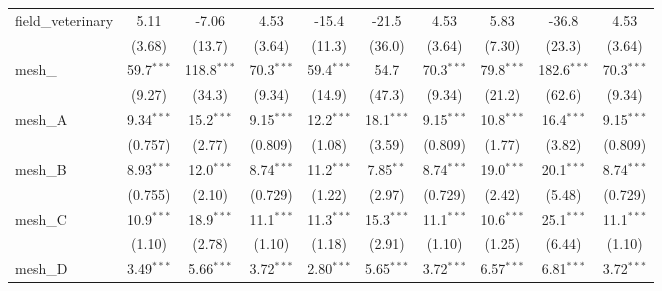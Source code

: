 \begin{tabular}{lccccccccc}
   field\_veterinary                                           & 5.11          & -7.06         & 4.53          & -15.4         & -21.5          & 4.53          & 5.83          & -36.8         & 4.53\\   
                                                               & (3.68)        & (13.7)        & (3.64)        & (11.3)        & (36.0)         & (3.64)        & (7.30)        & (23.3)        & (3.64)\\   
   mesh\_                                                      & 59.7$^{***}$  & 118.8$^{***}$ & 70.3$^{***}$  & 59.4$^{***}$  & 54.7           & 70.3$^{***}$  & 79.8$^{***}$  & 182.6$^{***}$ & 70.3$^{***}$\\   
                                                               & (9.27)        & (34.3)        & (9.34)        & (14.9)        & (47.3)         & (9.34)        & (21.2)        & (62.6)        & (9.34)\\   
   mesh\_A                                                     & 9.34$^{***}$  & 15.2$^{***}$  & 9.15$^{***}$  & 12.2$^{***}$  & 18.1$^{***}$   & 9.15$^{***}$  & 10.8$^{***}$  & 16.4$^{***}$  & 9.15$^{***}$\\   
                                                               & (0.757)       & (2.77)        & (0.809)       & (1.08)        & (3.59)         & (0.809)       & (1.77)        & (3.82)        & (0.809)\\   
   mesh\_B                                                     & 8.93$^{***}$  & 12.0$^{***}$  & 8.74$^{***}$  & 11.2$^{***}$  & 7.85$^{**}$    & 8.74$^{***}$  & 19.0$^{***}$  & 20.1$^{***}$  & 8.74$^{***}$\\   
                                                               & (0.755)       & (2.10)        & (0.729)       & (1.22)        & (2.97)         & (0.729)       & (2.42)        & (5.48)        & (0.729)\\   
   mesh\_C                                                     & 10.9$^{***}$  & 18.9$^{***}$  & 11.1$^{***}$  & 11.3$^{***}$  & 15.3$^{***}$   & 11.1$^{***}$  & 10.6$^{***}$  & 25.1$^{***}$  & 11.1$^{***}$\\   
                                                               & (1.10)        & (2.78)        & (1.10)        & (1.18)        & (2.91)         & (1.10)        & (1.25)        & (6.44)        & (1.10)\\   
   mesh\_D                                                     & 3.49$^{***}$  & 5.66$^{***}$  & 3.72$^{***}$  & 2.80$^{***}$  & 5.65$^{***}$   & 3.72$^{***}$  & 6.57$^{***}$  & 6.81$^{***}$  & 3.72$^{***}$\\   

\end{tabular}
